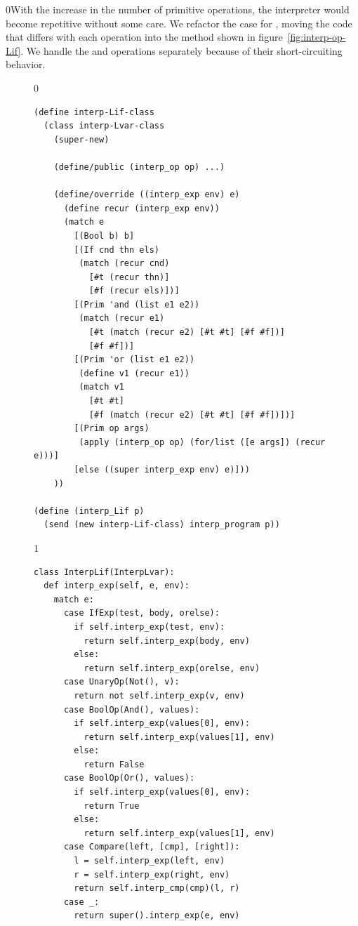 \documentclass[7x10]{TimesAPriori_MIT}%
\def\racketEd{0}
\def\pythonEd{1}
\providecommand{\BookEdition}{1}
\let\edition\BookEdition
\newcommand{\racket}[1]{{\if\edition\racketEd{#1}\fi}}
\newcommand{\pythonColor}[0]{}
\numberwithin{theorem}{chapter}
\numberwithin{definition}{chapter}
\numberwithin{equation}{chapter}
\begin{document}
\racket{With the increase in the number of primitive operations, the
  interpreter would become repetitive without some care.  We refactor
  the case for \code{Prim}, moving the code that differs with each
  operation into the \code{interp\_op} method shown in
  figure~\ref{fig:interp-op-Lif}. We handle the \code{and} and
  \code{or} operations separately because of their short-circuiting
  behavior.}

\begin{figure}[tbp]
\begin{tcolorbox}[colback=white]
{\if\edition\racketEd    
\begin{lstlisting}
(define interp-Lif-class
  (class interp-Lvar-class
    (super-new)

    (define/public (interp_op op) ...)

    (define/override ((interp_exp env) e)
      (define recur (interp_exp env))
      (match e
        [(Bool b) b]
        [(If cnd thn els)
         (match (recur cnd)
           [#t (recur thn)]
           [#f (recur els)])]
        [(Prim 'and (list e1 e2))
         (match (recur e1)
           [#t (match (recur e2) [#t #t] [#f #f])]
           [#f #f])]
        [(Prim 'or (list e1 e2))
         (define v1 (recur e1))
         (match v1
           [#t #t]
           [#f (match (recur e2) [#t #t] [#f #f])])]
        [(Prim op args)
         (apply (interp_op op) (for/list ([e args]) (recur e)))]
        [else ((super interp_exp env) e)]))
    ))

(define (interp_Lif p)
  (send (new interp-Lif-class) interp_program p))
\end{lstlisting}
\fi}
{\if\edition\pythonEd\pythonColor
\begin{lstlisting}
class InterpLif(InterpLvar):
  def interp_exp(self, e, env):
    match e:
      case IfExp(test, body, orelse):
        if self.interp_exp(test, env):
          return self.interp_exp(body, env)
        else:
          return self.interp_exp(orelse, env)
      case UnaryOp(Not(), v):
        return not self.interp_exp(v, env)
      case BoolOp(And(), values):
        if self.interp_exp(values[0], env):
          return self.interp_exp(values[1], env)
        else:
          return False
      case BoolOp(Or(), values):
        if self.interp_exp(values[0], env):
          return True
        else:
          return self.interp_exp(values[1], env)
      case Compare(left, [cmp], [right]):
        l = self.interp_exp(left, env)
        r = self.interp_exp(right, env)
        return self.interp_cmp(cmp)(l, r)
      case _:
        return super().interp_exp(e, env)


\end{lstlisting}}
\end{tcolorbox}
\end{figure}
\end{document}
